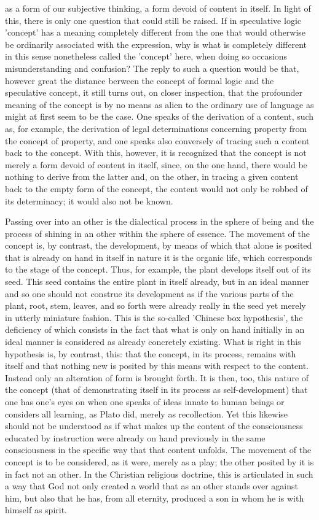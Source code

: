 as a form of our subjective thinking, a form devoid of content in itself.
 In light of this, there is only one question that could still be raised.
If in speculative logic 'concept' has a meaning completely different from the one that would otherwise
be ordinarily associated with the expression, why is what is completely different in
this sense nonetheless called the 'concept' here, when doing so
occasions misunderstanding and confusion?
The reply to such a question would be that,
however great the distance berween the concept of formal logic and
the speculative concept, it still turns out, on closer inspection, that the profounder
meaning of the concept is by no means as alien to the ordinary use of language as
might at first seem to be the case.
One speaks of the derivation of a content, such
as, for example, the derivation of legal determinations concerning property from
the concept of property, and one speaks also conversely of tracing such a content
back to the concept. With this, however, it is recognized that the concept is not
merely a form devoid of content in itself, since, on the one hand, there would be
nothing to derive from the latter and, on the other, in tracing a given content back
to the empty form of the concept, the content would not only be robbed of its
determinacy; it would also not be known.

Passing over into an other is the dialectical process in the sphere of being and
the process of shining in an other within the sphere of essence.
The movement of the concept is, by contrast, the development, by means of which
that alone is posited that is already on hand in itself in nature it is the organic life,
which corresponds to the stage of the concept.
Thus, for example, the plant develops itself out of its seed.
This seed contains the entire plant in itself already,
but in an ideal manner and so one should not construe its development as if the various
parts of the plant, root, stem, leaves, and so forth were already really in the seed yet
merely in utterly miniature fashion.
This is the so-called 'Chinese box hypothesis',
the deficiency of which consists in the fact that what is only on hand initially
in an ideal manner is considered as already concretely existing.
What is right in this hypothesis is, by contrast, this:
that the concept, in its process, remains with itself and
that nothing new is posited by this means with respect to the content.
Instead only an alteration of form is brought forth.
It is then, too, this nature of the concept
(that of demonstrating itself in its process as self-development)
that one has one's eyes on when one speaks of ideas innate to human beings or
considers all learning, as Plato did, merely as recollection.
Yet this likewise should not be understood as if what makes up the content of
the consciousness educated by instruction were already on hand previously in
the same consciousness in the specific way that that content unfolds.
The movement of the concept is to be considered, as it were, merely as a play;
the other posited by it is in fact not an other.
In the Christian religious doctrine, this is articulated in such a way that God
not only created a world that as an other stands over against him,
but also that he has, from all eternity, produced a son in whom he is with himself as spirit.

